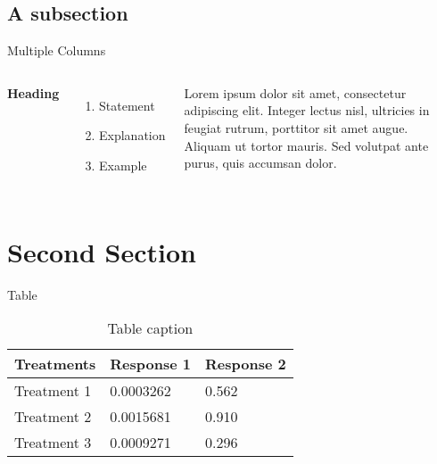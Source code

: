 \documentclass[12pt]{beamer}
\begin{document}

\subsection{A subsection}
\begin{frame}{Multiple Columns}
    \begin{columns}[c] %

        \textbf{Heading}
        \begin{enumerate}
            \item Statement
            \item Explanation
            \item Example
        \end{enumerate}

        Lorem ipsum dolor sit amet, consectetur adipiscing elit. Integer lectus nisl, ultricies in feugiat rutrum, porttitor sit amet augue. Aliquam ut tortor mauris. Sed volutpat ante purus, quis accumsan dolor.

    \end{columns}
\end{frame}

\section{Second Section}

\begin{frame}{Table}
    \begin{table}
        \begin{tabular}{l l l}
            \toprule
            \textbf{Treatments} & \textbf{Response 1} & \textbf{Response 2} \\
            \midrule
            Treatment 1         & 0.0003262           & 0.562               \\
            Treatment 2         & 0.0015681           & 0.910               \\
            Treatment 3         & 0.0009271           & 0.296               \\
            \bottomrule
        \end{tabular}
        \caption{Table caption}
    \end{table}
\end{frame}
\end{document}
